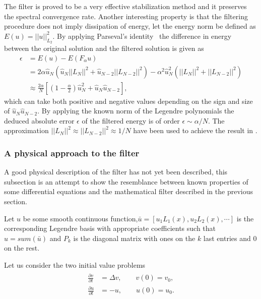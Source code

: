The filter is proved to be a very effective stabilization method and it preserves the 
spectral convergence rate. Another interesting property is that the filtering procedure 
does not imply dissipation of energy, let the energy norm be defined as $E(u) = ||u||_{L_2}^2$.  
By applying Parseval's identity~\cite{Young} the difference in energy between the original solution
and the filtered solution is given as 
\begin{align}
   \epsilon&=E(u) - E(F_{\alpha}u) \\
                &= 2\alpha\hat{u}_N(\hat{u}_N||L_N||^2+\hat{u}_{N-2}||L_{N-2}||^2)
    - \alpha^2\hat{u}^2_N(||L_N||^2+||L_{N-2}||^2)\\
    &\approx \frac{2\alpha}{N}\left[  (1-\frac{\alpha}{2})\hat{u}_N^2 + 
    \hat{u}_N\hat{u}_{N-2}\right],
    \label{eq:filterenergy}
\end{align}
which can take both positive and negative values depending on the sign and size of
$\hat{u}_N\hat{u}_{N-2}$. By applying the known norm of the Legendre polynomials 
the deduced absolute error $\epsilon$ of the filtered energy is of order 
$\epsilon\sim \alpha/N$. The approximation $||L_N||^2\approx||L_{N-2}||^2\approx 1/N$
have been used to achieve the result in .

\subsubsection{A physical approach to the filter}
A good physical description of the filter has not yet been described, this 
subsection is an attempt to show the resemblance between known properties 
of some differential equations and the mathematical filter described in the previous section.

Let $u$ be some smooth continuous function,$\bar u = [u_1L_1(x),u_2L_2(x), \cdots]$
is the corresponding Legendre basis with 
appropriate coefficients such that $u = sum(\bar u)$
and $P_{k}$ is the diagonal matrix with ones on the $k$ last entries and $0$ on the rest.

Let us consider the two initial value problems 
\begin{align}
    \begin{split}
    \frac{\partial v }{\partial t} &= \Delta v, \qquad v(0) = v_0, \\
    \frac{\partial u }{\partial t} &= -u, \qquad u(0) = u_0.
    \end{split}
    \label{eq:ivps}
\end{align}

